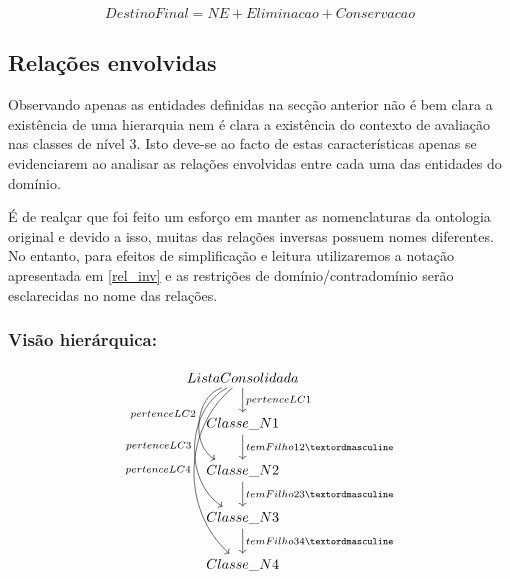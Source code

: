 \documentclass[tikz,runningheads,a4paper]{llncs}
\begin{document}
\begin{equation*}
    DestinoFinal = NE + Eliminacao + Conservacao
\end{equation*}

\subsection{Relações envolvidas}

Observando apenas as entidades definidas na secção anterior não é bem clara a existência de uma hierarquia nem é clara a existência do contexto de avaliação nas classes de nível 3. Isto deve-se ao facto de estas características apenas se evidenciarem ao analisar as relações envolvidas entre cada uma das entidades do domínio.

É de realçar que foi feito um esforço em manter as nomenclaturas da ontologia original e devido a isso, muitas das relações inversas possuem nomes diferentes. No entanto, para efeitos de simplificação e leitura utilizaremos a notação apresentada em \ref{rel_inv} e as restrições de domínio/contradomínio serão esclarecidas no nome das relações.

\subsubsection{Visão hierárquica:}

\begin{equation}
\label{vis_geral}
\begin{tikzcd}
ListaConsolidada \arrow{d}{pertenceLC1} \arrow[swap,bend right=67]{dd}{pertenceLC2} \arrow[swap,bend right=60]{ddd}{pertenceLC3} \arrow[swap,bend right=49]{dddd}{pertenceLC4} \\
Classe\_N1 \arrow{d}{temFilho12º}                                                                                                                                     \\
Classe\_N2 \arrow{d}{temFilho23º}                                                                                                                                     \\
Classe\_N3 \arrow{d}{temFilho34º}                                                                                                                                     \\
Classe\_N4                                                                                                                                                             
\end{tikzcd}
\end{equation}
\end{document}
